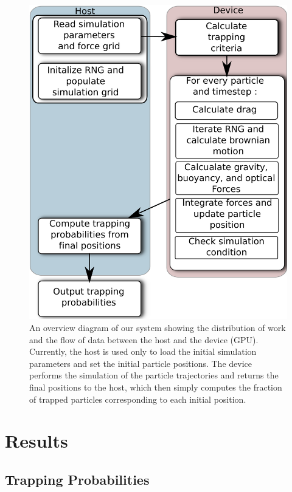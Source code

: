 \documentclass[twocolumn,10pt]{asme2ej}
\begin{document}
\begin{figure}[htb!]
\includegraphics[width=\columnwidth]{figures/overview}
\caption{ An overview diagram of our system showing the distribution
  of work and the flow of data between the host and the device (GPU).
  Currently, the host is used only to load the initial simulation
  parameters and set the initial particle positions.  The device
  performs the simulation of the particle trajectories and returns the
  final positions to the host, which then simply computes the fraction
  of trapped particles corresponding to each initial position.  }
\label{fig:overview}
\end{figure}



\section{Results}
\label{sec:results}

\subsection{Trapping Probabilities}

\end{document}

